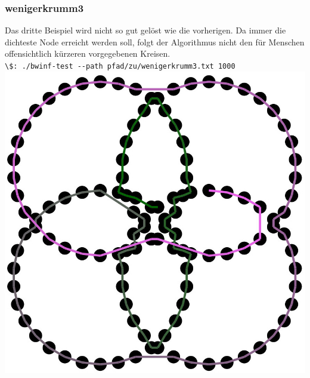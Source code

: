 \documentclass[a4paper,10pt,ngerman]{scrartcl}
\begin{document}
    \subsubsection{wenigerkrumm3}
        Das dritte Beispiel wird nicht so gut gelöst wie die vorherigen. Da immer die dichteste Node erreicht werden soll, folgt der Algorithmus nicht den für Menschen offensichtlich kürzeren vorgegebenen Kreisen.\\
        \lstinline{\$: ./bwinf-test --path pfad/zu/wenigerkrumm3.txt 1000} \\
        \includegraphics[]{output__wenigerkrumm3__1921.1172.jpg}
\end{document}
